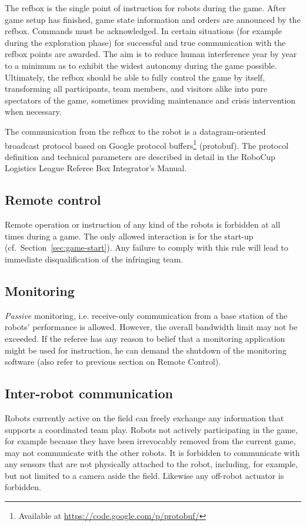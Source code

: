 \documentclass[12pt,twoside]{article}
\newcommand{\refsec}[1]{Section~\ref{#1}}
\begin{document}
The refbox is the single point of instruction for robots during the
game. After game setup has finished, game state information and orders
are announced by the refbox. Commands must be acknowledged. In certain
situations (for example during the exploration phase) for successful
and true communication with the refbox points are awarded. The aim is
to reduce human interference year by year to a minimum as to exhibit
the widest autonomy during the game possible. Ultimately, the refbox
should be able to fully control the game by itself, transforming all
participants, team members, and visitors alike into pure spectators of
the game, sometimes providing maintenance and crisis intervention when
necessary.

The communication from the refbox to the robot is a datagram-oriented
broadcast protocol based on Google protocol buffers\footnote{Available
  at \url{https://code.google.com/p/protobuf/}} (protobuf). The
protocol definition and technical parameters are described in detail
in the RoboCup Logistics League Referee Box Integrator's Manual.

\subsection{Remote control}
\label{sec:remote-control}
Remote operation or instruction of any kind of the robots is forbidden
at all times during a game. The only allowed interaction is for the
start-up (cf.~\refsec{sec:game-start}). Any failure to comply with
this rule will lead to immediate disqualification of the infringing
team.

\subsection{Monitoring}
\label{sec:monitoring}
\emph{Passive} monitoring, i.e. receive-only communication from a base
station of the robots' performance is allowed. However, the overall
bandwidth limit may not be exceeded.
If the referee has any reason to belief that a monitoring application
might be used for instruction, he can demand the shutdown of the
monitoring software (also refer to previous section on Remote
Control).

\subsection{Inter-robot communication}
\label{sec:inter-robot-comm}
Robots currently active on the field can freely exchange any
information that supports a coordinated team play. Robots not actively
participating in the game, for example because they have been
irrevocably removed from the current game, may not communicate with
the other robots. It is forbidden to communicate with any sensors that
are not physically attached to the robot, including, for example, but
not limited to a camera aside the field. Likewise any off-robot
actuator is forbidden.
\end{document}

